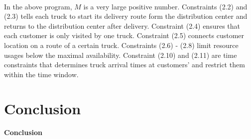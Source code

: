 \documentclass[12pt]{article}
\numberwithin{equation}{section}
\begin{document}
	\paragraph{}In the above program, $M$ is a very large positive number. Constraints (2.2) and (2.3) tells each truck to start its delivery route form the distribution center and returns to the distribution center after delivery. Constraint (2.4) ensures that each customer is only visited by one truck. Constraint (2.5) connects customer location on a route of a certain truck. Constraints (2.6) - (2.8) limit resource usages below the maximal availability. Constraint (2.10) and (2.11) are time constraints that determines truck arrival times at customers' and restrict them within the time window.

\section{Conclusion}
	
	\paragraph{Conclusion}
	
\newpage

\nocite{*}
\printbibliography

\newpage

	
\end{document}
